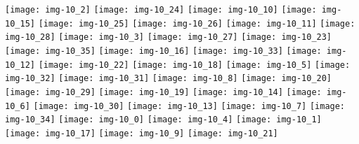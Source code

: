 \documentclass[a4paper]{article}
\begin{document}
	\texttt{[image: img-10\_2]}
	\texttt{[image: img-10\_24]}
	\texttt{[image: img-10\_10]}
	\texttt{[image: img-10\_15]}
	\texttt{[image: img-10\_25]}
	\texttt{[image: img-10\_26]}
	\texttt{[image: img-10\_11]}
	\texttt{[image: img-10\_28]}
	\texttt{[image: img-10\_3]}
	\texttt{[image: img-10\_27]}
	\texttt{[image: img-10\_23]}
	\texttt{[image: img-10\_35]}
	\texttt{[image: img-10\_16]}
	\texttt{[image: img-10\_33]}
	\texttt{[image: img-10\_12]}
	\texttt{[image: img-10\_22]}
	\texttt{[image: img-10\_18]}
	\texttt{[image: img-10\_5]}
	\texttt{[image: img-10\_32]}
	\texttt{[image: img-10\_31]}
	\texttt{[image: img-10\_8]}
	\texttt{[image: img-10\_20]}
	\texttt{[image: img-10\_29]}
	\texttt{[image: img-10\_19]}
	\texttt{[image: img-10\_14]}
	\texttt{[image: img-10\_6]}
	\texttt{[image: img-10\_30]}
	\texttt{[image: img-10\_13]}
	\texttt{[image: img-10\_7]}
	\texttt{[image: img-10\_34]}
	\texttt{[image: img-10\_0]}
	\texttt{[image: img-10\_4]}
	\texttt{[image: img-10\_1]}
	\texttt{[image: img-10\_17]}
	\texttt{[image: img-10\_9]}
	\texttt{[image: img-10\_21]}
\end{document}
